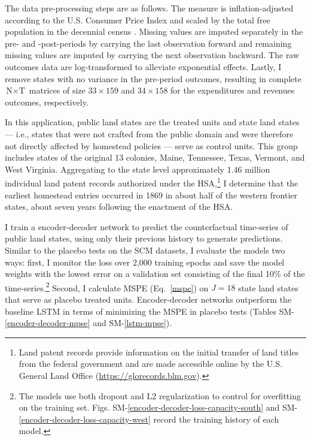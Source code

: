 \documentclass[hidelinks,12pt]{article}
\begin{document}
The data pre-processing steps are as follows. The measure is inflation-adjusted according to the U.S. Consumer Price Index \citep{williamson2017seven} and scaled by the total free population in the decennial census \citep{haines2010}. Missing values are imputed separately in the pre- and -post-periods by carrying the last observation forward and remaining missing values are imputed by carrying the next observation backward. The raw outcomes data are log-transformed to alleviate exponential effects. Lastly, I remove states with no variance in the pre-period outcomes, resulting in complete $\text{N} \times \text{T}$ matrices of size $33 \times 159$ and $34 \times 158$ for the expenditures and revenues outcomes, respectively. 

In this application, public land states are the treated units and state land states --- i.e., states that were not crafted from the public domain and were therefore not directly affected by homestead policies --- serve as control units. This group includes states of the original 13 colonies, Maine, Tennessee, Texas, Vermont, and West Virginia. Aggregating to the state level approximately 1.46 million individual land patent records authorized under the HSA,\footnote{Land patent records provide information on the initial transfer of land titles from the federal government and are made accessible online by the U.S. General Land Office (\url{https://glorecords.blm.gov}).} I determine that the earliest homestead entries occurred in 1869 in about half of the western frontier states, about seven years following the enactment of the HSA.


I train a encoder-decoder network to predict the counterfactual time-series of public land states, using only their previous history to generate predictions. Similar to the placebo tests on the SCM datasets, I evaluate the models two ways: first, I monitor the loss over 2,000 training epochs and save the model weights with the lowest error on a validation set consisting of the final 10\% of the time-series.\footnote{The models use both dropout and L2 regularization to control for overfitting on the training set. Figs. SM-\ref{encoder-decoder-loss-capacity-south} and SM-\ref{encoder-decoder-loss-capacity-west} record the training history of each model.} Second, I calculate MSPE (Eq.~\ref{mspe}) on $J=18$ state land states that serve as placebo treated units. Encoder-decoder networks outperform the baseline LSTM in terms of minimizing the MSPE in placebo tests (Tables SM-\ref{encoder-decoder-mpse} and SM-\ref{lstm-mpse}).
\end{document}
